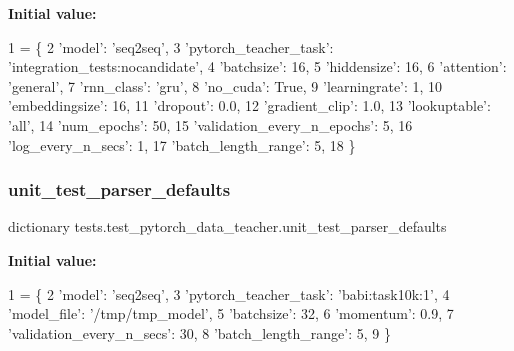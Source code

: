{\bfseries Initial value\+:}
\begin{DoxyCode}
1 =  \{
2     \textcolor{stringliteral}{'model'}: \textcolor{stringliteral}{'seq2seq'},
3     \textcolor{stringliteral}{'pytorch\_teacher\_task'}: \textcolor{stringliteral}{'integration\_tests:nocandidate'},
4     \textcolor{stringliteral}{'batchsize'}: 16,
5     \textcolor{stringliteral}{'hiddensize'}: 16,
6     \textcolor{stringliteral}{'attention'}: \textcolor{stringliteral}{'general'},
7     \textcolor{stringliteral}{'rnn\_class'}: \textcolor{stringliteral}{'gru'},
8     \textcolor{stringliteral}{'no\_cuda'}: \textcolor{keyword}{True},
9     \textcolor{stringliteral}{'learningrate'}: 1,
10     \textcolor{stringliteral}{'embeddingsize'}: 16,
11     \textcolor{stringliteral}{'dropout'}: 0.0,
12     \textcolor{stringliteral}{'gradient\_clip'}: 1.0,
13     \textcolor{stringliteral}{'lookuptable'}: \textcolor{stringliteral}{'all'},
14     \textcolor{stringliteral}{'num\_epochs'}: 50,
15     \textcolor{stringliteral}{'validation\_every\_n\_epochs'}: 5,
16     \textcolor{stringliteral}{'log\_every\_n\_secs'}: 1,
17     \textcolor{stringliteral}{'batch\_length\_range'}: 5,
18 \}
\end{DoxyCode}
\mbox{\label{namespacetests_1_1test__pytorch__data__teacher_a20b08dfc55904cf898ea79dec26a4a52}} 
\subsubsection{\texorpdfstring{unit\+\_\+test\+\_\+parser\+\_\+defaults}{unit\_test\_parser\_defaults}}
{\footnotesize\ttfamily dictionary tests.\+test\+\_\+pytorch\+\_\+data\+\_\+teacher.\+unit\+\_\+test\+\_\+parser\+\_\+defaults}

{\bfseries Initial value\+:}
\begin{DoxyCode}
1 =  \{
2     \textcolor{stringliteral}{'model'}: \textcolor{stringliteral}{'seq2seq'},
3     \textcolor{stringliteral}{'pytorch\_teacher\_task'}: \textcolor{stringliteral}{'babi:task10k:1'},
4     \textcolor{stringliteral}{'model\_file'}: \textcolor{stringliteral}{'/tmp/tmp\_model'},
5     \textcolor{stringliteral}{'batchsize'}: 32,
6     \textcolor{stringliteral}{'momentum'}: 0.9,
7     \textcolor{stringliteral}{'validation\_every\_n\_secs'}: 30,
8     \textcolor{stringliteral}{'batch\_length\_range'}: 5,
9 \}
\end{DoxyCode}
